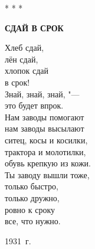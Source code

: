 \begin{center}
    * * *
\end{center}

\begin{center}
    \textbf{СДАЙ В СРОК}
\end{center}

\hspace{4cm}
\parbox{10cm}{
Хлеб сдай, \\
лён сдай, \\
хлопок сдай \\
в срок!\\

Знай, знай, знай, "--- \\
это будет впрок. \\
Нам заводы помогают \\
нам заводы высылают\\
ситец, косы и косилки, \\
трактора и молотилки,\\

обувь крепкую из кожи. \\
Ты заводу вышли тоже, \\
только быстро, \\
только дружно,\\
ровно к сроку \\
все, что нужно. 
}

\begin{flushright}
    1931~г.
\end{flushright}